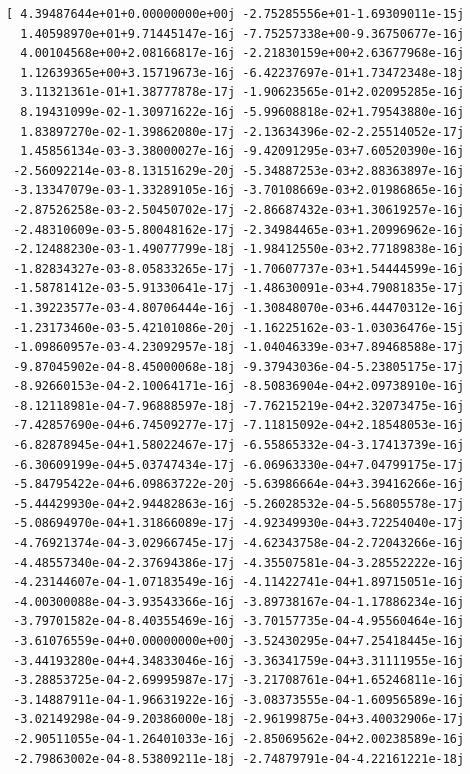 \documentclass[12pt]{article}
\begin{document}
\begin{lstlisting}[caption=Results in vector form, label=lst:result]
[ 4.39487644e+01+0.00000000e+00j -2.75285556e+01-1.69309011e-15j
  1.40598970e+01+9.71445147e-16j -7.75257338e+00-9.36750677e-16j
  4.00104568e+00+2.08166817e-16j -2.21830159e+00+2.63677968e-16j
  1.12639365e+00+3.15719673e-16j -6.42237697e-01+1.73472348e-18j
  3.11321361e-01+1.38777878e-17j -1.90623565e-01+2.02095285e-16j
  8.19431099e-02-1.30971622e-16j -5.99608818e-02+1.79543880e-16j
  1.83897270e-02-1.39862080e-17j -2.13634396e-02-2.25514052e-17j
  1.45856134e-03-3.38000027e-16j -9.42091295e-03+7.60520390e-16j
 -2.56092214e-03-8.13151629e-20j -5.34887253e-03+2.88363897e-16j
 -3.13347079e-03-1.33289105e-16j -3.70108669e-03+2.01986865e-16j
 -2.87526258e-03-2.50450702e-17j -2.86687432e-03+1.30619257e-16j
 -2.48310609e-03-5.80048162e-17j -2.34984465e-03+1.20996962e-16j
 -2.12488230e-03-1.49077799e-18j -1.98412550e-03+2.77189838e-16j
 -1.82834327e-03-8.05833265e-17j -1.70607737e-03+1.54444599e-16j
 -1.58781412e-03-5.91330641e-17j -1.48630091e-03+4.79081835e-17j
 -1.39223577e-03-4.80706444e-16j -1.30848070e-03+6.44470312e-16j
 -1.23173460e-03-5.42101086e-20j -1.16225162e-03-1.03036476e-15j
 -1.09860957e-03-4.23092957e-18j -1.04046339e-03+7.89468588e-17j
 -9.87045902e-04-8.45000068e-18j -9.37943036e-04-5.23805175e-17j
 -8.92660153e-04-2.10064171e-16j -8.50836904e-04+2.09738910e-16j
 -8.12118981e-04-7.96888597e-18j -7.76215219e-04+2.32073475e-16j
 -7.42857690e-04+6.74509277e-17j -7.11815092e-04+2.18548053e-16j
 -6.82878945e-04+1.58022467e-17j -6.55865332e-04-3.17413739e-16j
 -6.30609199e-04+5.03747434e-17j -6.06963330e-04+7.04799175e-17j
 -5.84795422e-04+6.09863722e-20j -5.63986664e-04+3.39416266e-16j
 -5.44429930e-04+2.94482863e-16j -5.26028532e-04-5.56805578e-17j
 -5.08694970e-04+1.31866089e-17j -4.92349930e-04+3.72254040e-17j
 -4.76921374e-04-3.02966745e-17j -4.62343758e-04-2.72043266e-16j
 -4.48557340e-04-2.37694386e-17j -4.35507581e-04-3.28552222e-16j
 -4.23144607e-04-1.07183549e-16j -4.11422741e-04+1.89715051e-16j
 -4.00300088e-04-3.93543366e-16j -3.89738167e-04-1.17886234e-16j
 -3.79701582e-04-8.40355469e-16j -3.70157735e-04-4.95560464e-16j
 -3.61076559e-04+0.00000000e+00j -3.52430295e-04+7.25418445e-16j
 -3.44193280e-04+4.34833046e-16j -3.36341759e-04+3.31111955e-16j
 -3.28853725e-04-2.69995987e-17j -3.21708761e-04+1.65246811e-16j
 -3.14887911e-04-1.96631922e-16j -3.08373555e-04-1.60956589e-16j
 -3.02149298e-04-9.20386000e-18j -2.96199875e-04+3.40032906e-17j
 -2.90511055e-04-1.26401033e-16j -2.85069562e-04+2.00238589e-16j
 -2.79863002e-04-8.53809211e-18j -2.74879791e-04-4.22161221e-18j

\end{lstlisting}
\end{document}
